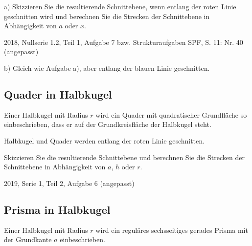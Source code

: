 a) Skizzieren Sie die resultierende Schnittebene, wenn entlang der
roten Linie geschnitten wird und berechnen Sie die Strecken der
Schnittebene in Abhängigkeit von $a$ oder $x$.

{\tiny{2018, Nullserie 1.2, Teil 1, Aufgabe 7 bzw. Strukturaufgaben SPF, S. 11: Nr. 40 (angepasst)}}


b) Gleich wie Aufgabe a), aber entlang der blauen Linie geschnitten.



\subsection{Quader in Halbkugel}

Einer Halbkugel mit Radius $r$ wird ein Quader mit quadratischer
Grundfläche so einbeschrieben, dass er auf der Grundkreisfläche
der Halbkugel steht.

Halbkugel und Quader werden entlang der roten Linie geschnitten.

Skizzieren Sie die resultierende Schnittebene und berechnen Sie
die Strecken der Schnittebene in Abhängigkeit von $a$, $h$ oder $r$.

{\tiny{2019, Serie 1, Teil 2, Aufgabe 6 (angepasst)}}


\subsection{Prisma in Halbkugel}
Einer Halbkugel mit Radius $r$ wird ein reguläres sechsseitiges
gerades Prisma mit der Grundkante $a$ einbeschrieben.

